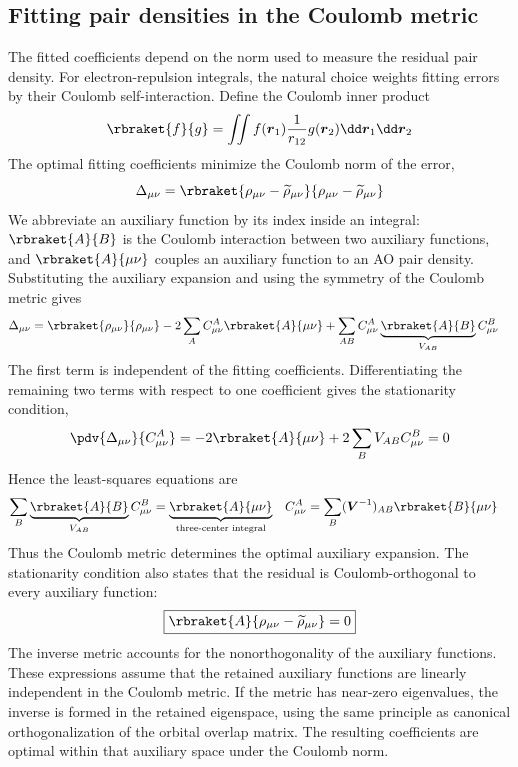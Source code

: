 \documentclass[11pt,a4paper,titlepage]{article}
\numberwithin{equation}{section}
\newcommand{\br}{\boldsymbol{r}}
\newcommand{\bV}{\boldsymbol{V}}
\begin{document}
\subsection{Fitting pair densities in the Coulomb metric}

The fitted coefficients depend on the norm used to measure the residual pair
density. For electron-repulsion integrals, the natural choice weights fitting
errors by their Coulomb self-interaction. Define the Coulomb inner product
\begin{equation}
 \rbraket{f}{g}=\iint f(\br_1)\frac{1}{r_{12}}g(\br_2)
 \dd\br_1\dd\br_2
\end{equation}
The optimal fitting coefficients minimize the Coulomb norm of the error,
\begin{equation}
 \Delta_{\mu\nu}=\rbraket{\rho_{\mu\nu}-\widetilde\rho_{\mu\nu}}
 {\rho_{\mu\nu}-\widetilde\rho_{\mu\nu}}
\end{equation}
We abbreviate an auxiliary function by its index inside an integral:
$\rbraket{A}{B}$ is the Coulomb interaction between two auxiliary functions,
and $\rbraket{A}{\mu\nu}$ couples an auxiliary function to an AO pair density.
Substituting the auxiliary expansion and using the symmetry of the Coulomb
metric gives
\begin{equation}
\begin{split}
 \Delta_{\mu\nu}
 ={}&\rbraket{\rho_{\mu\nu}}{\rho_{\mu\nu}}
 -2\sum_A C_{\mu\nu}^A\rbraket{A}{\mu\nu}
 +\sum_{AB}C_{\mu\nu}^A
 \underbrace{\rbraket{A}{B}}_{V_{AB}}C_{\mu\nu}^B
\end{split}
\end{equation}
The first term is independent of the fitting coefficients. Differentiating
the remaining two terms with respect to one coefficient gives the
stationarity condition,
\begin{equation}
 \pdv{\Delta_{\mu\nu}}{C_{\mu\nu}^A}
 =-2\rbraket{A}{\mu\nu}
 +2\sum_BV_{AB}C_{\mu\nu}^B=0
\end{equation}
Hence the least-squares equations are
\begin{align}
  \sum_B\underbrace{\rbraket{A}{B}}_{V_{AB}}C_{\mu\nu}^B
 &=\underbrace{\rbraket{A}{\mu\nu}}_{\text{three-center integral}}
  &
  C_{\mu\nu}^A&=\sum_B(\bV^{-1})_{AB}\rbraket{B}{\mu\nu}
\end{align}
Thus the Coulomb metric determines the optimal auxiliary expansion. The
stationarity condition also states that the residual is Coulomb-orthogonal
to every auxiliary function:
\begin{equation}
  \boxed{
 \rbraket{A}{\rho_{\mu\nu}-\widetilde\rho_{\mu\nu}}=0
  }
 \label{eq:ri-projection-orthogonality}
\end{equation}
The inverse metric accounts for the nonorthogonality of the auxiliary
functions. These expressions assume that the retained auxiliary functions
are linearly independent in the Coulomb metric. If the metric has
near-zero eigenvalues, the inverse is formed in the retained eigenspace,
using the same principle as canonical orthogonalization of the orbital
overlap matrix. The resulting coefficients are optimal within that
auxiliary space under the Coulomb norm.
\end{document}
